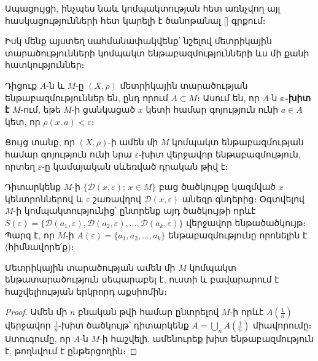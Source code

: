 \documentclass[./main.tex]{subfiles}
\begin{document}
\par Ապացույցի, ինչպես նաև կոմպակտության հետ առնչվող այլ հասկացություն\-նե\-րի հետ կարելի է ծանոթանալ [\qquad] գրքում։ 

\par Իսկ մենք այստեղ սահմանափակվենք՝ նշելով մետրիկային տարածությունների կոմպակտ ենթաբազմությունների ևս մի քանի հատկություններ։

\begin{definition}
Դիցուք $A$-ն և $M$-ը $(X, \rho)$ մետրիկային տարածության ենթաբազ\-մություններ են, ընդ որում $A \subset M$։ Ասում են, որ $A$-ն \textbf{$\boldsymbol{\varepsilon}$-խիտ է} $M$-ում, եթե $M$-ի ցանկացած $x$ կետի համար գոյություն ունի $a \in A$ կետ, որ $\rho(x, a) < \varepsilon$։
\end{definition}

\par Ցույց տանք, որ $(X, \rho)$-ի ամեն մի $M$ կոմպակտ ենթաբազմության համար գո\-յու\-թյուն ունի նրա $\varepsilon$-խիտ վերջավոր ենթաբազմություն, որտեղ $\varepsilon$-ը կամայական սևեռ\-ված դրական թիվ է։

\par Դիտարկենք $M$-ի $\{\mathcal{D}(x, \varepsilon);\, x \in M\}$ բաց ծածկույթը կազմված $x$ կենտրոններով և $\varepsilon$ շառավղով $\mathcal{D}(x, \varepsilon)$ անեզր գնդերից։ Օգտվելով $M$-ի կոմպակտությունից՝ ընտ\-րենք այդ ծածկույթի որևէ $S(\varepsilon) = \{\mathcal{D}(a_1, \varepsilon), \mathcal{D}(a_2, \varepsilon), \dots, \mathcal{D}(a_k, \varepsilon)\}$ վերջավոր ենթա\-ծածկույթ։ Պարզ է, որ $M$-ի $A(\varepsilon) = \{a_1, a_2, \dots, a_k\}$ ենթաբազմությունը որոնելին է (հիմ\-նա\-վո\-րե՛ք)։

\begin{theorem}\label{ch17thm13}
Մետրիկային տարածության ամեն մի $M$ կոմպակտ ենթա\-տա\-րա\-ծու\-թյուն սեպարաբել է, ուստի և բավարարում է հաշվելիության երկրորդ աքսիոմին։
\end{theorem}

\begin{proof}
Ամեն մի $n$ բնական թվի համար ընտրելով $M$-ի որևէ $A(\frac{1}{n})$ վեր\-ջա\-վոր $\frac{1}{n}$-խիտ ծածկույթ՝ դիտարկենք $A = \bigcup\limits_n A(\frac{1}{n})$ միավորումը։ Ստուգումը, որ $A$-ն $M$-ի հաշվելի, ամենուրեք խիտ ենթաբազմություն է, թողնվում է ընթերցողին։ 
\end{proof}
\end{document}
